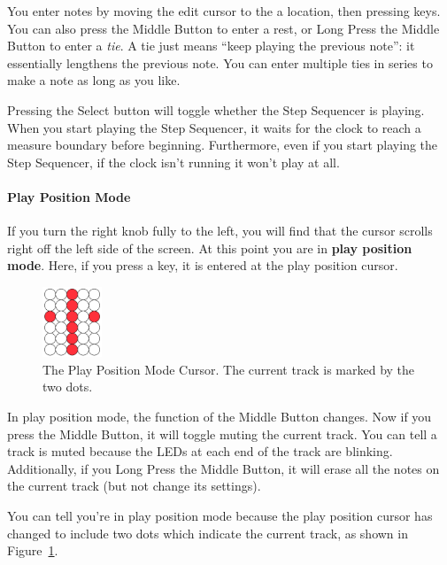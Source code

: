 \documentclass{article}
\begin{document}
You enter notes by moving the edit cursor to the a location, then pressing keys.  You can also press the Middle Button to enter a rest, or Long Press the Middle Button to enter a {\it tie}.  A tie just means ``keep playing the previous note'': it essentially lengthens the previous note.  You can enter multiple ties in series to make a note as long as you like.

\enlargethispage{1em}

Pressing the Select button will toggle whether the Step Sequencer is playing.  When you start playing the Step Sequencer, it waits for the clock to reach a measure boundary before beginning.  Furthermore, even if you start playing the Step Sequencer, if the clock isn't running it won't play at all.

\paragraph{Play Position Mode}

If you turn the right knob fully to the left, you will find that the cursor scrolls right off the left side of the screen.  At this point you are in {\bf play position mode}.  Here, if you press a key, it is entered at the play position cursor.

\begin{figure}
\vspace{-1em}\hspace{\fill}\includegraphics[width=0.7in]{playpositionmode}\hspace{\fill}%
\vspace{-1em}
\caption{\small The Play Position Mode Cursor.  The current track is marked by the two dots.}\vspace{-1em}
\label{playpositionmode}
\end{figure}


In play position mode, the function of the Middle Button changes.  Now if you press the Middle Button, it will toggle muting the current track.  You can tell a track is muted because the LEDs at each end of the track are blinking.  Additionally, if you Long Press the Middle Button, it will erase all the notes on the current track (but not change its settings).

You can tell you're in play position mode because the play position cursor has changed to include two dots which indicate the current track, as shown in Figure~\ref{playpositionmode}.
\end{document}
